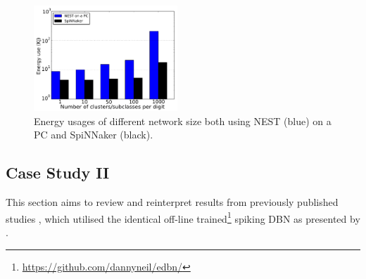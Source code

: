 \documentclass{frontiersENG} %
\begin{document}
\begin{table}[h]
\begin{center}
\begin{tabular} {l| c  c c c c c}
%			
		\end{tabular}
    \egroup
		\label{tbl:compare}
	\end{center}
\end{table}

\begin{figure}[hbt!]
	\centering
	\includegraphics[width=0.48\textwidth]{fig8}
	\caption{Energy usages of different network size both using NEST (blue) on a PC and SpiNNaker (black).}
	\label{fig:energy}
\end{figure}
\subsection{Case Study II}
This section aims to review and reinterpret results from previously published studies  \citep{Stromatias2015LiveDemo,Stromatias2015scalable,stromatias2015robustness}, which utilised the identical off-line trained\footnote{\url{https://github.com/dannyneil/edbn/}} spiking DBN as presented by \citet{o2013real}.
\end{document}
